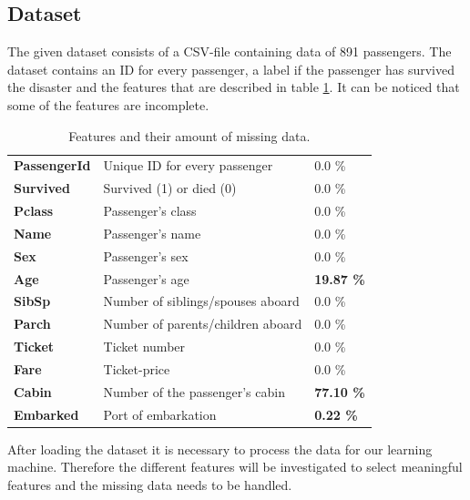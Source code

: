 \subsection{Dataset}
The given dataset consists of a CSV-file containing data of 891 passengers. The dataset contains an ID for every passenger, a label if the passenger has survived the disaster and the features that are described in table \ref{tab:features}. It can be noticed that some of the features are incomplete.

\begin{table}
\caption{Features and their amount of missing data.}
\begin{tabular}{>{\bfseries}l l l}
PassengerId & Unique ID for every passenger & 0.0 \%\\
Survived & Survived (1) or died (0) & 0.0 \% \\
Pclass & Passenger's class & 0.0 \% \\
Name & Passenger's name & 0.0 \% \\
Sex & Passenger's sex & 0.0 \% \\
Age & Passenger's age & \textbf{19.87 \%} \\
SibSp & Number of siblings/spouses aboard & 0.0 \% \\
Parch & Number of parents/children aboard & 0.0 \% \\
Ticket & Ticket number & 0.0 \% \\
Fare & Ticket-price & 0.0 \% \\
Cabin & Number of the passenger's cabin & \textbf{77.10 \%} \\
Embarked & Port of embarkation & \textbf{0.22 \%} \\
\end{tabular}
\centering
\label{tab:features}
\end{table}

After loading the dataset it is necessary to process the data for our learning machine. Therefore the different features will be investigated to select meaningful features and the missing data needs to be handled.

